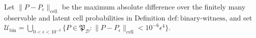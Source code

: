 Let \(\|P-P_{\epsilon}\|_{\mathrm{cell}}\) be the maximum absolute difference over the finitely many observable and latent cell probabilities in Definition \(\mathrm{def{:}binary\text{-}witness}\), and set \(\mathcal U_{\mathrm{bin}}=\bigcup_{0<\epsilon<10^{-3}}\{P\in\mathfrak P_{\mathcal D}:\|P-P_{\epsilon}\|_{\mathrm{cell}}<10^{-6}\epsilon^4\}\).